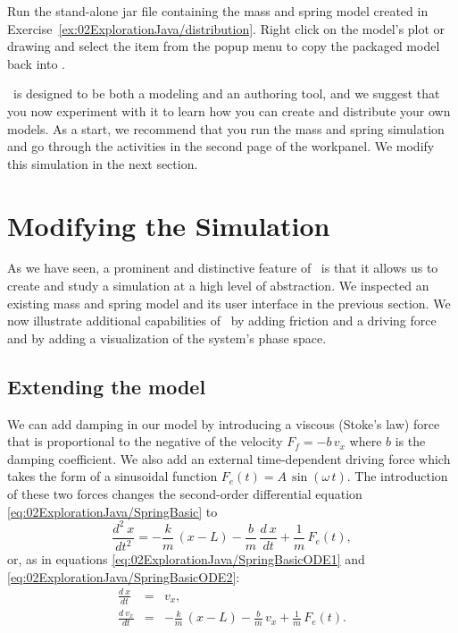 \begin{exercise}\label{ex:02ExplorationJava/redistribution}
Run the stand-alone jar file containing the mass and spring model created in Exercise~\ref{ex:02ExplorationJava/distribution}.  Right click on the model's plot or drawing and select the  item from the popup menu to copy the packaged model back into \ejs.
\end{exercise}

\ejs\ is designed to be both a modeling and an authoring tool, and we suggest that you now experiment with it to learn
how you can create and distribute your own models. As a start, we recommend that you run the mass and spring simulation
and go through the activities in the second page of the  workpanel.  We modify this simulation in the next
section.

\section{Modifying the Simulation}\label{section:02ExplorationJavaModifying}

As we have seen, a prominent and distinctive feature of \Ejs\ is that it allows us to create and study a simulation at
a high level of abstraction. We inspected an existing mass and spring model and its user interface in the previous
section. We now illustrate additional capabilities of \Ejs\ by adding friction and a driving force and by adding a
visualization of the system's phase space.

\subsection{Extending the model}\label{section:02ExplorationJavaModifyingModel}
We can add damping in our model by introducing a viscous (Stoke's law) force that is proportional to the negative of
the velocity $F_f = - b\,v_x$ where $b$ is the damping coefficient. We also add an external time-dependent driving
force which takes the form of a sinusoidal function $F_e(t)=A\,\sin(\omega\, t)$. The introduction of these two forces
changes the second-order differential equation \eqref{eq:02ExplorationJava/SpringBasic} to
\begin{equation}
  \frac{d^2\ x}{dt^2} = -\frac{k}{m}\,(x-L) - \frac{b}{m}\,\frac{d\ x}{dt} + \frac{1}{m}\,F_e(t), \label{eq:02ExplorationJava/SpringComplete}
\end{equation}
or, as in equations \eqref{eq:02ExplorationJava/SpringBasicODE1} and \eqref{eq:02ExplorationJava/SpringBasicODE2}:
\begin{eqnarray}
  \frac{d\ x} {dt} &=& v_x,                  \label{eq:02ExplorationJava/SpringCompleteODE1} \\
  \frac{d\ v_x}{dt} &=& -\frac{k}{m}\,(x-L) - \frac{b}{m}\,v_x + \frac{1}{m}\,F_e(t). \label{eq:02ExplorationJava/SpringCompleteODE2}
\end{eqnarray}

